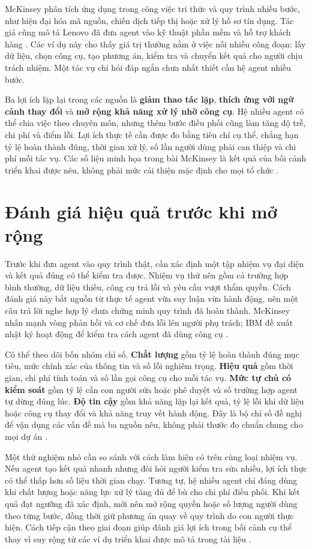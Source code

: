 \documentclass[12pt,a4paper]{report}
\begin{document}
McKinsey phân tích ứng dụng trong công việc tri thức và quy trình nhiều bước, như
hiện đại hóa mã nguồn, chiến dịch tiếp thị hoặc xử lý hồ sơ tín dụng. Tác giả cũng
mô tả Lenovo đã đưa agent vào kỹ thuật phần mềm và hỗ trợ khách hàng
\cite{mckinsey}. Các ví dụ này cho thấy giá trị thường nằm ở việc nối nhiều công đoạn:
lấy dữ liệu, chọn công cụ, tạo phương án, kiểm tra và chuyển kết quả cho người chịu
trách nhiệm. Một tác vụ chỉ hỏi đáp ngắn chưa nhất thiết cần hệ agent nhiều bước.

Ba lợi ích lặp lại trong các nguồn là \textbf{giảm thao tác lặp}, \textbf{thích ứng với
ngữ cảnh thay đổi} và \textbf{mở rộng khả năng xử lý nhờ công cụ}. Hệ nhiều agent có
thể chia việc theo chuyên môn, nhưng thêm bước điều phối cũng làm tăng độ trễ, chi
phí và điểm lỗi. Lợi ích thực tế cần được đo bằng tiêu chí cụ thể, chẳng hạn tỷ lệ
hoàn thành đúng, thời gian xử lý, số lần người dùng phải can thiệp và chi phí mỗi
tác vụ. Các số liệu minh họa trong bài McKinsey là kết quả của bối cảnh triển khai
được nêu, không phải mức cải thiện mặc định cho mọi tổ chức \cite{mckinsey}.

\section{Đánh giá hiệu quả trước khi mở rộng}
Trước khi đưa agent vào quy trình thật, cần xác định một tập nhiệm vụ đại diện và
kết quả đúng có thể kiểm tra được. Nhiệm vụ thử nên gồm cả trường hợp bình thường,
dữ liệu thiếu, công cụ trả lỗi và yêu cầu vượt thẩm quyền. Cách đánh giá này bắt
nguồn từ thực tế agent vừa suy luận vừa hành động, nên một câu trả lời nghe hợp lý
chưa chứng minh quy trình đã hoàn thành. McKinsey nhấn mạnh vòng phản hồi và cơ chế
đưa lỗi lên người phụ trách; IBM đề xuất nhật ký hoạt động để kiểm tra cách agent
đã dùng công cụ \cite{mckinsey,ibm}.

Có thể theo dõi bốn nhóm chỉ số. \textbf{Chất lượng} gồm tỷ lệ hoàn thành đúng mục
tiêu, mức chính xác của thông tin và số lỗi nghiêm trọng. \textbf{Hiệu quả} gồm
thời gian, chi phí tính toán và số lần gọi công cụ cho mỗi tác vụ. \textbf{Mức tự
chủ có kiểm soát} gồm tỷ lệ cần con người sửa hoặc phê duyệt và số trường hợp agent
tự dừng đúng lúc. \textbf{Độ tin cậy} gồm khả năng lặp lại kết quả, tỷ lệ lỗi khi
dữ liệu hoặc công cụ thay đổi và khả năng truy vết hành động. Đây là bộ chỉ số đề
nghị để vận dụng các vấn đề mà ba nguồn nêu, không phải thước đo chuẩn chung cho
mọi dự án \cite{google,ibm,mckinsey}.

Một thử nghiệm nhỏ cần so sánh với cách làm hiện có trên cùng loại nhiệm vụ. Nếu
agent tạo kết quả nhanh nhưng đòi hỏi người kiểm tra sửa nhiều, lợi ích thực có
thể thấp hơn số liệu thời gian chạy. Tương tự, hệ nhiều agent chỉ đáng dùng khi
chất lượng hoặc năng lực xử lý tăng đủ để bù cho chi phí điều phối. Khi kết quả
đạt ngưỡng đã xác định, mới nên mở rộng quyền hoặc số lượng người dùng theo từng
bước, đồng thời giữ phương án quay về quy trình do con người thực hiện. Cách tiếp
cận theo giai đoạn giúp đánh giá lợi ích trong bối cảnh cụ thể thay vì suy rộng
từ các ví dụ triển khai được mô tả trong tài liệu \cite{mckinsey}.
\end{document}
